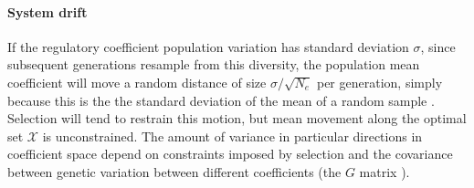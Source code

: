 \documentclass{article}
\newcommand{\1}{\mathbbm{1}}
\newcommand{\optx}{\mathcal{X}}
\begin{document}
\paragraph{System drift}
If the regulatory coefficient population variation
has standard deviation $\sigma$,
since subsequent generations resample from this diversity,
the population mean coefficient will move a random distance of size $\sigma/\sqrt{N_e}$ per generation,
simply because this is the the standard deviation of the mean of a random sample \citep{lande_drift}.
Selection will tend to restrain this motion,
but mean movement along the optimal set $\optx$ is unconstrained.
The amount of variance in particular directions in coefficient space 
depend on constraints imposed by selection and 
the covariance between genetic variation between different coefficients (the $G$ matrix \citep{G_matrix}).

\end{document}
